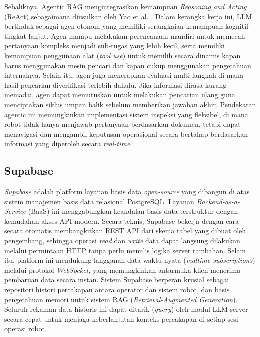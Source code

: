 Sebaliknya, Agentic RAG mengintegrasikan kemampuan \textit{Reasoning and Acting} (ReAct) sebagaimana diusulkan oleh Yao et al. \cite{yao2022react}. Dalam kerangka kerja ini, LLM bertindak sebagai agen otonom yang memiliki serangkaian kemampuan kognitif tingkat lanjut. Agen mampu melakukan perencanaan mandiri untuk memecah pertanyaan kompleks menjadi sub-tugas yang lebih kecil, serta memiliki kemampuan penggunaan alat (\textit{tool use}) untuk memilih secara dinamis kapan harus menggunakan mesin pencari dan kapan cukup menggunakan pengetahuan internalnya. Selain itu, agen juga menerapkan evaluasi multi-langkah di mana hasil pencarian diverifikasi terlebih dahulu. Jika informasi dirasa kurang memadai, agen dapat memutuskan untuk melakukan pencarian ulang guna menciptakan siklus umpan balik sebelum memberikan jawaban akhir. Pendekatan agentic ini memungkinkan implementasi sistem inspeksi yang fleksibel, di mana robot tidak hanya menjawab pertanyaan berdasarkan dokumen, tetapi dapat menavigasi dan mengambil keputusan operasional secara bertahap berdasarkan informasi yang diperoleh secara \textit{real-time}.


\subsection{Supabase}
\textit{Supabase} adalah platform layanan basis data \textit{open-source} yang dibangun di atas sistem manajemen basis data relasional PostgreSQL. Layanan \textit{Backend-as-a-Service} (BaaS) ini menggabungkan keandalan basis data terstruktur dengan kemudahan akses API modern. Secara teknis, Supabase bekerja dengan cara secara otomatis membangkitkan REST API dari skema tabel yang dibuat oleh pengembang, sehingga operasi \textit{read} dan \textit{write} data dapat langsung dilakukan melalui permintaan HTTP tanpa perlu menulis logika server tambahan. Selain itu, platform ini mendukung langganan data waktu-nyata (\textit{realtime subscriptions}) melalui protokol \textit{WebSocket}, yang memungkinkan antarmuka klien menerima pembaruan data secara instan. Sistem Supabase berperan krusial sebagai repositori histori percakapan antara operator dan sistem robot, dan basis pengetahuan memori untuk sistem RAG (\textit{Retrieval-Augmented Generation}). Seluruh rekaman data historis ini dapat ditarik (\textit{query}) oleh modul LLM server secara cepat untuk menjaga keberlanjutan konteks percakapan di setiap sesi operasi robot.



